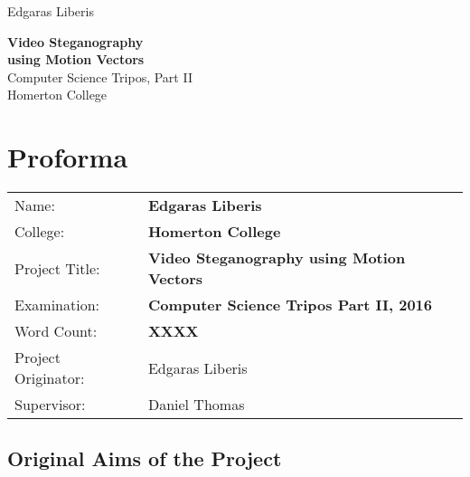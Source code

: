 \documentclass[12pt,british,twoside,notitlepage,usenames,dvipsnames,hypens,final]{report}
\numberwithin{equation}{section}
\numberwithin{figure}{section}
\begin{document}
\pagestyle{empty}

\hfill{\LARGE Edgaras Liberis}

\vspace*{60mm}
\begin{center}
\Huge
{\bf Video Steganography \\ using Motion Vectors} \\
\vspace*{10mm}
{ \sc \LARGE
Computer Science Tripos, Part II \\
Homerton College \\
}
\vspace*{10mm}
\the\year 
\end{center}

\cleardoublepage

\setcounter{page}{1}
\pagestyle{plain}

\chapter*{Proforma}

\vspace{-0.5cm}
{\large
\begin{tabular}{ll}
Name:               & \bf Edgaras Liberis                          \\
College:            & \bf Homerton College                         \\
Project Title:      & \bf Video Steganography using Motion Vectors \\
Examination:        & \bf Computer Science Tripos Part II, 2016    \\
Word Count:         & \bf XXXX\footnotemark[1]                     \\
Project Originator: & Edgaras Liberis                              \\
Supervisor:         & Daniel Thomas                                \\ 
\end{tabular}
}
\vspace{0.5cm}

\section*{Original Aims of the Project}

\lipsum[1]
\end{document}
